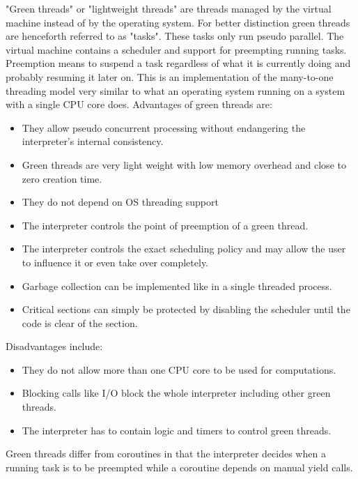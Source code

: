 \documentclass[bachelor,english]{hgbthesis}
\begin{document}
"Green threads" or "lightweight threads" are threads managed by the virtual machine instead of by the operating system. For better distinction green threads are henceforth referred to as "tasks". These tasks only run pseudo parallel. The virtual machine contains a scheduler and support for preempting running tasks.
Preemption means to suspend a task regardless of what it is currently doing and probably resuming it later on.
This is an implementation of the many-to-one threading model very similar to what an operating system running on a system with a single CPU core does.
%
Advantages of green threads are:
%
\begin{itemize}
\item They allow pseudo concurrent processing without endangering the interpreter's internal consistency.
\item Green threads are very light weight with low memory overhead and close to zero creation time.
\item They do not depend on OS threading support
\item The interpreter controls the point of preemption of a green thread.
\item The interpreter controls the exact scheduling policy and may allow the user to influence it or even take over completely.
\item Garbage collection can be implemented like in a single threaded process.
\item Critical sections can simply be protected by disabling the scheduler until the code is clear of the section.
\end{itemize}
%
Disadvantages include:
%
\begin{itemize}
\item They do not allow more than one CPU core to be used for computations.
\item Blocking calls like I/O block the whole interpreter including other green threads.
\item The interpreter has to contain logic and timers to control green threads.
\end{itemize}

Green threads differ from coroutines in that the interpreter decides when a running task is to be preempted while a coroutine depends on manual yield calls.
\end{document}
